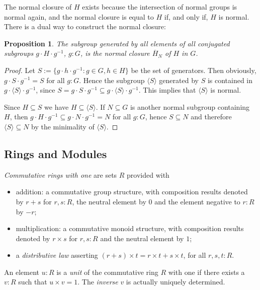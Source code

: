 \documentclass{amsart}
\theoremstyle{plain}
\numberwithin{equation}{section} %
\numberwithin{figure}{section} %
\theoremstyle{plain}
\theoremstyle{plain}
\theoremstyle{plain}
\theoremstyle{plain}
\theoremstyle{plain}
\newtheorem{prop}[thm]{Proposition} %
\theoremstyle{plain}
\theoremstyle{remark}
\theoremstyle{remark}
\theoremstyle{remark}
\begin{document}
The normal closure of $H$ exists because the intersection of normal groups is normal again, and the normal closure is equal to $H$ if, and only if, $H$ is normal. There is a dual way to construct the normal closure:
\begin{prop}    %
The subgroup generated by all elements of all conjugated subgroups $g \cdot H \cdot g^{-1}$, $g : G$, is the normal closure $\overline{H}_N$ of $H$ in $G$.
\end{prop} 
\begin{proof}
Let $S := \{g \cdot h \cdot g^{-1} : g \in G, h \in H\}$ be the set of generators. Then obviously, $g \cdot S \cdot g^{-1} = S$ for all $g : G$. Hence the subgroup $\langle S \rangle$ generated by $S$ is contained in $g \cdot \langle S \rangle \cdot g^{-1}$, since $S = g \cdot S \cdot g^{-1} \subseteq g \cdot \langle S \rangle \cdot g^{-1}$. This implies that $\langle S \rangle$ is normal.

Since $H \subseteq S$ we have $H \subseteq \langle S \rangle$. If $N \subseteq G$ is another normal subgroup containing $H$, then $g \cdot H \cdot g^{-1} \subseteq g \cdot N \cdot g^{-1} = N$ for all $g : G$, hence $S \subseteq N$ and therefore $\langle S \rangle \subseteq N$ by the minimality of $\langle S \rangle$.
\end{proof}


\subsection{Rings and Modules} \label{ring-mod-ssec}

\textit{Commutative rings with one} are sets $R$ provided with
\begin{itemize}
\item addition: a commutative group structure, with composition results denoted by $r + s$ for $r, s : R$, the neutral element by $0$ and the element negative to $r : R$ by $-r$;
\item multiplication: a commutative monoid structure, with composition results denoted by $r \times s$ for $r, s : R$ and the neutral element by $1$;
\item a \textit{distributive law} asserting $(r + s) \times t = r \times t + s \times t$, for all $r, s, t : R$.
\end{itemize}

An element $u : R$ is a \textit{unit} of the commutative ring $R$ with one if there exists a $v : R$ such that $u \times v = 1$. The \textit{inverse} $v$ is actually uniquely determined.
\end{document}
